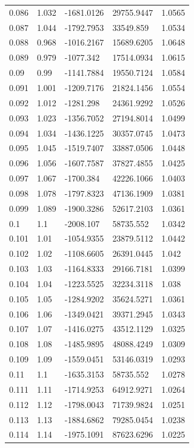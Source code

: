 \begin{tabular}{lllll}
0.086 & 1.032 & -1681.0126 & 29755.9447 & 1.0565 \\
0.087 & 1.044 & -1792.7953 & 33549.859 & 1.0534 \\
0.088 & 0.968 & -1016.2167 & 15689.6205 & 1.0648 \\
0.089 & 0.979 & -1077.342 & 17514.0934 & 1.0615 \\
0.09 & 0.99 & -1141.7884 & 19550.7124 & 1.0584 \\
0.091 & 1.001 & -1209.7176 & 21824.1456 & 1.0554 \\
0.092 & 1.012 & -1281.298 & 24361.9292 & 1.0526 \\
0.093 & 1.023 & -1356.7052 & 27194.8014 & 1.0499 \\
0.094 & 1.034 & -1436.1225 & 30357.0745 & 1.0473 \\
0.095 & 1.045 & -1519.7407 & 33887.0506 & 1.0448 \\
0.096 & 1.056 & -1607.7587 & 37827.4855 & 1.0425 \\
0.097 & 1.067 & -1700.384 & 42226.1066 & 1.0403 \\
0.098 & 1.078 & -1797.8323 & 47136.1909 & 1.0381 \\
0.099 & 1.089 & -1900.3286 & 52617.2103 & 1.0361 \\
0.1 & 1.1 & -2008.107 & 58735.552 & 1.0342 \\
0.101 & 1.01 & -1054.9355 & 23879.5112 & 1.0442 \\
0.102 & 1.02 & -1108.6605 & 26391.0445 & 1.042 \\
0.103 & 1.03 & -1164.8333 & 29166.7181 & 1.0399 \\
0.104 & 1.04 & -1223.5525 & 32234.3118 & 1.038 \\
0.105 & 1.05 & -1284.9202 & 35624.5271 & 1.0361 \\
0.106 & 1.06 & -1349.0421 & 39371.2945 & 1.0343 \\
0.107 & 1.07 & -1416.0275 & 43512.1129 & 1.0325 \\
0.108 & 1.08 & -1485.9895 & 48088.4249 & 1.0309 \\
0.109 & 1.09 & -1559.0451 & 53146.0319 & 1.0293 \\
0.11 & 1.1 & -1635.3153 & 58735.552 & 1.0278 \\
0.111 & 1.11 & -1714.9253 & 64912.9271 & 1.0264 \\
0.112 & 1.12 & -1798.0043 & 71739.9824 & 1.0251 \\
0.113 & 1.13 & -1884.6862 & 79285.0454 & 1.0238 \\
0.114 & 1.14 & -1975.1091 & 87623.6296 & 1.0225 \\

\end{tabular}

